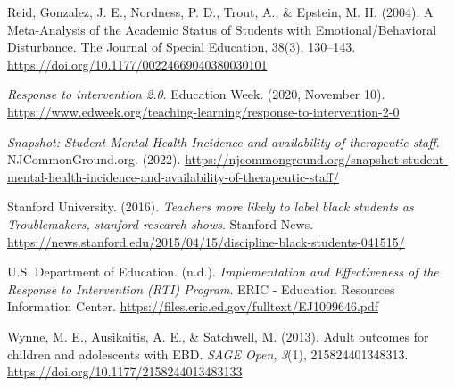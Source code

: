\documentclass[11pt]{article}
\begin{document}
\begin{references}[Reference]
\item Reid, Gonzalez, J. E., Nordness, P. D., Trout, A., \& Epstein, M. H. (2004). A Meta-Analysis of the Academic Status of Students with Emotional/Behavioral Disturbance. The Journal of Special Education, 38(3), 130--143. \url{https://doi.org/10.1177/00224669040380030101}
\item \textit{Response to intervention 2.0}. Education Week. (2020, November 10). \url{https://www.edweek.org/teaching-learning/response-to-intervention-2-0}
\item \textit{Snapshot: Student Mental Health Incidence and availability of therapeutic staff}. NJCommonGround.org. (2022). \url{https://njcommonground.org/snapshot-student-mental-health-incidence-and-availability-of-therapeutic-staff/}
\item Stanford University. (2016). \textit{Teachers more likely to label black students as Troublemakers, stanford research shows}. Stanford News. \url{https://news.stanford.edu/2015/04/15/discipline-black-students-041515/}
\item U.S. Department of Education. (n.d.). \textit{Implementation and Effectiveness of the Response to Intervention (RTI) Program}. ERIC - Education Resources Information Center. \url{https://files.eric.ed.gov/fulltext/EJ1099646.pdf}
\item Wynne, M. E., Ausikaitis, A. E., \& Satchwell, M. (2013). Adult outcomes for children and adolescents with EBD. \textit{SAGE Open}, \textit{3}(1), 215824401348313. \url{https://doi.org/10.1177/2158244013483133}
\end{references}
\end{document}
